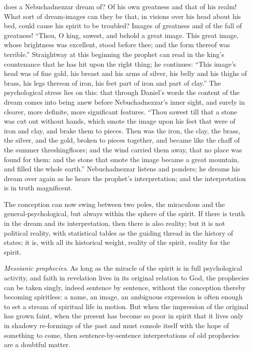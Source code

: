 \documentclass[12pt,a4paper,openany]{book}
\newcommand{\opage}[1]{\marginnote{\footnotesize\textit{[#1]}}}
\begin{document}
does a Nebuchadnezzar dream of? Of his own greatness and that of his
realm! What sort of dream-images can they be
that, in visions over his head about his
bed, could cause his spirit to be troubled? Images of
greatness and of the fall of greatness! ``Thou, O king, sawest,
and behold a great image. This great image, whose brightness
was excellent, stood before thee; and the form thereof
was terrible.'' Straightway at this beginning
the prophet can read in the king's countenance that he has hit upon
the right thing; he continues: ``This image's head
was of fine gold, his breast and his arms of silver, his belly
and his thighs of brass, his legs thereon of
iron, his feet part of iron and part of clay.'' The
psychological stress lies on this: that through Daniel's words the content of the dream
comes into being anew before Nebuchadnezzar's
inner sight, and surely in clearer, more definite,
more significant features. ``Thou sawest till that a stone
was cut out without hands, which
smote the image upon his feet that were of iron and clay,
and brake them to pieces. Then was the iron,
the clay, the brass, the silver, and the gold, broken to pieces together, and became like
the chaff of the summer threshingfloors; and the wind carried
them away, that no place was found for them: and
the stone that smote the image became a great mountain,
and filled the whole earth.'' Nebuchadnezzar listens and
ponders; he dreams his dream over again as he hears
the prophet's interpretation; and the interpretation is in truth
magnificent.

\setcounter{footnote}{0}%
\opage{44}The conception can now swing between two poles, the
miraculous and the general-psychological, but always
within the sphere of the spirit. If there is truth in the dream
and its interpretation, then there is also reality; but
it is not political reality, with statistical tables
as the guiding thread in the history of states; it is, with all its historical
weight, reality of the spirit, reality for
the spirit.

\emph{Messianic prophecies}. As long as the miracle of the spirit
is in full psychological activity, and faith in revelation
lives in its original relation to God, the
prophecies can be taken singly, indeed sentence by sentence, without
the conception thereby becoming spiritless: a name, an image,
an ambiguous expression is often enough to set a stream
of spiritual life in motion. But when the impression of
the original has grown faint, when the present has
become so poor in spirit that it lives only in shadowy
re-formings of the past and must console
itself with the hope of something to come, then sentence-by-sentence
interpretations of old prophecies are a doubtful
matter.
\end{document}

